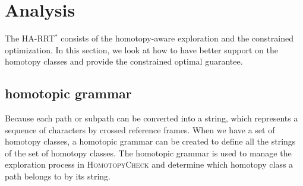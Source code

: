 \documentclass[letterpaper, 10 pt, conference]{ieeeconf}
\begin{document}
\section{Analysis}
\label{sec:analysis}

The HA-RRT$^{*}$ consists of the homotopy-aware exploration and the constrained optimization.
In this section, we look at how to have better support on the homotopy classes and provide the constrained optimal guarantee.

\subsection{homotopic grammar}
\label{sec:homotopic_grammar}

Because each path or subpath can be converted into a string, which represents a sequence of characters by crossed reference frames.
When we have a set of homotopy classes, a homotopic grammar can be created to define all the strings of the set of homotopy classes.
The homotopic grammar is used to manage the exploration process in \textsc{HomotopyCheck} and determine which homotopy class a path belongs to by its string.
\end{document}
